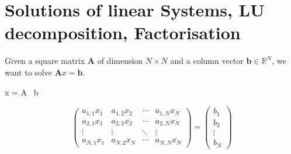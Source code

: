 \chapter{Solutions of linear Systems, LU decomposition, Factorisation} %
\label{cha:solutions_of_linear_systems_lu_decomposition_factorisation}

Given a square matrix $\mathbf{A}$ of dimension $N \times N$ and a column vector 
$\mathbf{b} \in \mathbb{R}^N$, we want to solve $\mathbf{A}x = \mathbf{b}$.

\begin{Matlab}
	x = A \ b
\end{Matlab}

\[ 
	\begin{pmatrix}
		a_{1,1}x_1 & a_{1,2}x_2 & \cdots & a_{1,N}x_N \\
		a_{2,1}x_1 & a_{2,2}x_2 & \cdots & a_{2,N}x_N \\
		\vdots  & \vdots  & \ddots & \vdots  \\
		a_{N,1}x_1 & a_{N,2}x_N & \cdots & a_{N,N}x_N
	\end{pmatrix}
	=
	\begin{pmatrix}
		b_1 \\
		b_2 \\
		\vdots \\
		b_N
	\end{pmatrix}
 \]



